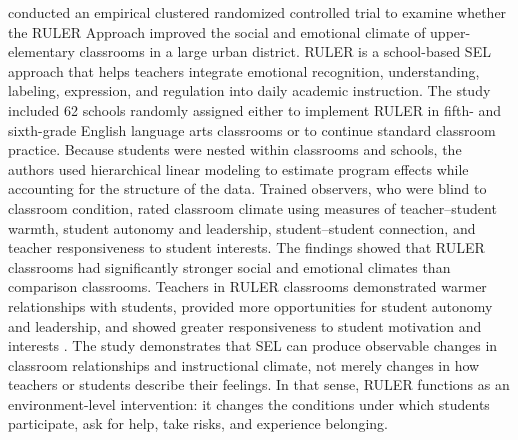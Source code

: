 \documentclass[11pt]{article}
\newcommand{\reviewsection}[1]{\vspace{0.07in}\noindent{\normalsize\bfseries\color{PrimaryRed}#1}\par\vspace{0.02in}}
\begin{document}
\reviewsection{Summary of Key Information}
\citet{rivers2013ruler} conducted an empirical clustered randomized controlled trial to examine whether the RULER Approach improved the social and emotional climate of upper-elementary classrooms in a large urban district. RULER is a school-based SEL approach that helps teachers integrate emotional recognition, understanding, labeling, expression, and regulation into daily academic instruction. The study included 62 schools randomly assigned either to implement RULER in fifth- and sixth-grade English language arts classrooms or to continue standard classroom practice. Because students were nested within classrooms and schools, the authors used hierarchical linear modeling to estimate program effects while accounting for the structure of the data. Trained observers, who were blind to classroom condition, rated classroom climate using measures of teacher--student warmth, student autonomy and leadership, student--student connection, and teacher responsiveness to student interests. The findings showed that RULER classrooms had significantly stronger social and emotional climates than comparison classrooms. Teachers in RULER classrooms demonstrated warmer relationships with students, provided more opportunities for student autonomy and leadership, and showed greater responsiveness to student motivation and interests \citep{rivers2013ruler}. The study demonstrates that SEL can produce observable changes in classroom relationships and instructional climate, not merely changes in how teachers or students describe their feelings. In that sense, RULER functions as an environment-level intervention: it changes the conditions under which students participate, ask for help, take risks, and experience belonging.
\end{document}
